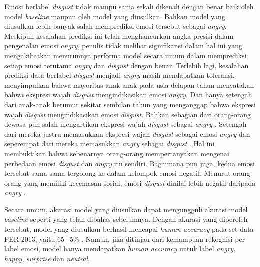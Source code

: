 Emosi berlabel \textit{disgust} tidak mampu sama sekali dikenali dengan benar baik oleh model \textit{baseline} maupun oleh model yang diusulkan. Bahkan model yang diusulkan lebih banyak salah memprediksi emosi tersebut sebagai \textit{angry}. Meskipun kesalahan prediksi ini telah menghancurkan angka presisi dalam pengenalan emosi \textit{angry}, penulis tidak melihat signifikansi dalam hal ini yang mengakibatkan menurunnya performa model secara umum dalam memprediksi setiap emosi terutama \textit{angry} dan \textit{disgust} dengan benar. Terlebih lagi, kesalahan prediksi data berlabel \textit{disgust} menjadi \textit{angry} masih mendapatkan toleransi.  menyimpulkan bahwa mayoritas anak-anak pada usia delapan tahun menyatakan bahwa ekspresi wajah \textit{disgust} mengindikasikan emosi \textit{angry}. Dan hanya setengah dari anak-anak berumur sekitar sembilan tahun yang menganggap bahwa ekspresi wajah \textit{disgust} mengindikasikan emosi \textit{disgust}. Bahkan sebagian dari orang-orang dewasa pun salah mengartikan ekspresi wajah \textit{disgust} sebagai \textit{angry} . Setengah dari mereka justru memasukkan ekspresi wajah \textit{disgust} sebagai emosi \textit{angry} dan seperempat dari mereka memasukkan \textit{angry} sebagai \textit{disgust} . Hal ini membuktikan bahwa sebenarnya orang-orang mempertanyakan mengenai perbedaan emosi \textit{disgust} dan \textit{angry} itu sendiri. Bagaimana pun juga, kedua emosi tersebut sama-sama tergolong ke dalam kelompok emosi negatif. Menurut orang-orang yang memiliki kecemasan sosial, emosi \textit{disgust} dinilai lebih negatif daripada \textit{angry} .

Secara umum, akurasi model yang diusulkan dapat mengungguli akurasi model \textit{baseline} seperti yang telah dibahas sebelumnya. Dengan akurasi yang diperoleh tersebut, model yang diusulkan berhasil mencapai \textit{human accuracy} pada set data FER-2013, yaitu 65$\pm$5\% . Namun, jika ditinjau dari kemampuan rekognisi per label emosi, model hanya mendapatkan \textit{human accuracy} untuk label \textit{angry}, \textit{happy}, \textit{surprise} dan \textit{neutral}.

